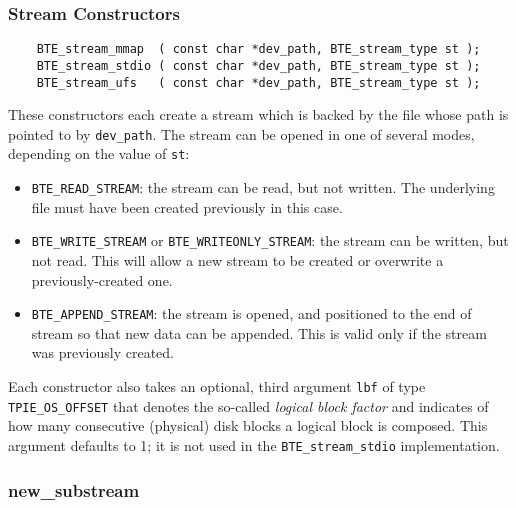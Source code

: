 

\vspace*{\baselineskip}
\subsubsection{Stream Constructors}

\begin{lstlisting}
    BTE_stream_mmap  ( const char *dev_path, BTE_stream_type st );
    BTE_stream_stdio ( const char *dev_path, BTE_stream_type st );
    BTE_stream_ufs   ( const char *dev_path, BTE_stream_type st );
\end{lstlisting}

\noindent
These constructors each create a stream which is backed by the file
whose path is pointed to by \lstinline|dev_path|.  The stream can be
opened in one of several modes, depending on the value of
\lstinline|st|:

\begin{itemize}
  
\item \lstinline|BTE_READ_STREAM|: the stream can be read, but not
  written. The underlying file must have been created previously in
  this case.
\item \lstinline|BTE_WRITE_STREAM| or
  \lstinline|BTE_WRITEONLY_STREAM|: the stream can be written, but not
  read. This will allow a new stream to be created or overwrite a
  previously-created one.
  
\item \lstinline|BTE_APPEND_STREAM|: the stream is opened, and
  positioned to the end of stream so that new data can be appended.
  This is valid only if the stream was previously created.
\end{itemize}

Each constructor also takes an optional, third argument
\lstinline|lbf| of type \lstinline|TPIE_OS_OFFSET| that denotes the
so-called \emph{logical block factor} and indicates of how many
consecutive (physical) disk blocks a logical block is composed. This
argument defaults to 1; it is not used in the
\lstinline|BTE_stream_stdio| implementation.

\vspace*{\baselineskip}
\subsubsection{new\_substream}


